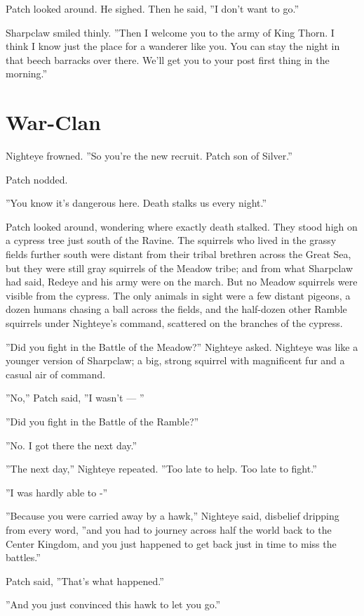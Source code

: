 \documentclass[12pt]{book}
\begin{document}
Patch looked around. He sighed. Then he said, ''I don't want to go.''

Sharpclaw smiled thinly. ''Then I welcome you to the army of King Thorn. I think I know just the place for a wanderer like you. You can stay the night in that beech barracks over there. We'll get you to your post first thing in the morning.''


\section{War-Clan}

Nighteye frowned. ''So you're the new recruit. Patch son of Silver.''

Patch nodded.

''You know it's dangerous here. Death stalks us every night.''

Patch looked around, wondering where exactly death stalked. They stood high on a cypress tree just south of the Ravine. The squirrels who lived in the grassy fields further south were distant from their tribal brethren across the Great Sea, but they were still gray squirrels of the Meadow tribe; and from what Sharpclaw had said, Redeye and his army were on the march. But no Meadow squirrels were visible from the cypress. The only animals in sight were a few distant pigeons, a dozen humans chasing a ball across the fields, and the half-dozen other Ramble squirrels under Nighteye's command, scattered on the branches of the cypress.

''Did you fight in the Battle of the Meadow?'' Nighteye asked. Nighteye was like a younger version of Sharpclaw; a big, strong squirrel with magnificent fur and a casual air of command.

''No,'' Patch said, ''I wasn't ---
''

''Did you fight in the Battle of the Ramble?''

''No. I got there the next day.''

''The next day,'' Nighteye repeated. ''Too late to help. Too late to fight.''

''I was hardly able to -''

''Because you were carried away by a hawk,'' Nighteye said, disbelief dripping from every word, ''and you had to journey across half the world back to the Center Kingdom, and you just happened to get back just in time to miss the battles.''

Patch said, ''That's what happened.''

''And you just convinced this hawk to let you go.''
\end{document}

